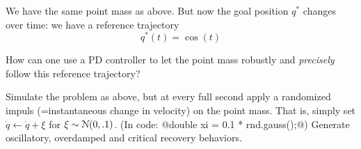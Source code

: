 

We have the same point mass as above. But now the goal position $q^*$
changes over time: we have a reference trajectory
$$q^*(t) = \cos(t)$$

How can one use a PD controller to let the point mass
robustly and \emph{precisely} follow this reference trajectory?

Simulate the problem as above, but at every full second apply a randomized
impuls (=instantaneous change in velocity) on the point mass. That
is, simply set $\dot q \gets \dot q + \xi$ for $\xi\sim{\cal N}(0,.1)$. (In
code: @double xi = 0.1 * rnd.gauss();@) Generate oscillatory,
overdamped and critical recovery behaviors.






\exerfoot
